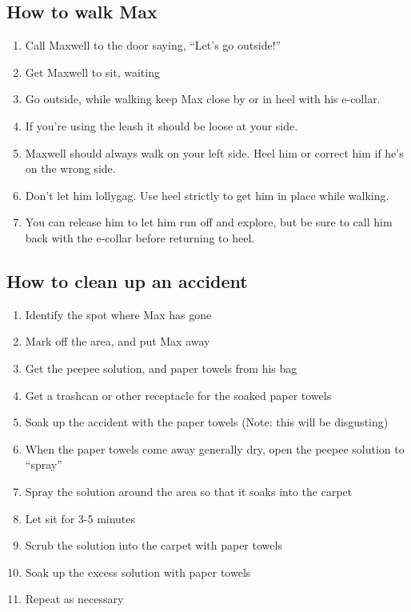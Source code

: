 \documentclass[pdftex,12pt]{article}
\begin{document}
\subsection{How to walk Max}
\begin{enumerate}\label{itm:how_to_walk}
    \item Call Maxwell to the door saying, ``Let's go outside!''
    \item Get Maxwell to sit, waiting
    \item Go outside, while walking keep Max close by or in heel with his e-collar.
    \item If you're using the leash it should be loose at your side.
    \item Maxwell should always walk on your left side.
        Heel him or correct him if he's on the wrong side.
    \item Don't let him lollygag.
        Use heel strictly to get him in place while walking.
    \item You can release him to let him run off and explore, but
        be sure to call him back with the e-collar before returning to heel.
\end{enumerate}

\subsection{How to clean up an accident}
\begin{enumerate}\label{itm:how_to_clean_accident}
    \item Identify the spot where Max has gone
    \item Mark off the area, and put Max away
    \item Get the peepee solution, and paper towels from his bag
    \item Get a trashcan or other receptacle for the soaked paper towels
    \item Soak up the accident with the paper towels (Note: this will be disgusting)
    \item When the paper towels come away generally dry, open the peepee solution to ``spray''
    \item Spray the solution around the area so that it soaks into the carpet
    \item Let sit for 3-5 minutes
    \item Scrub the solution into the carpet with paper towels
    \item Soak up the excess solution with paper towels
    \item Repeat as necessary
\end{enumerate}
\end{document}
